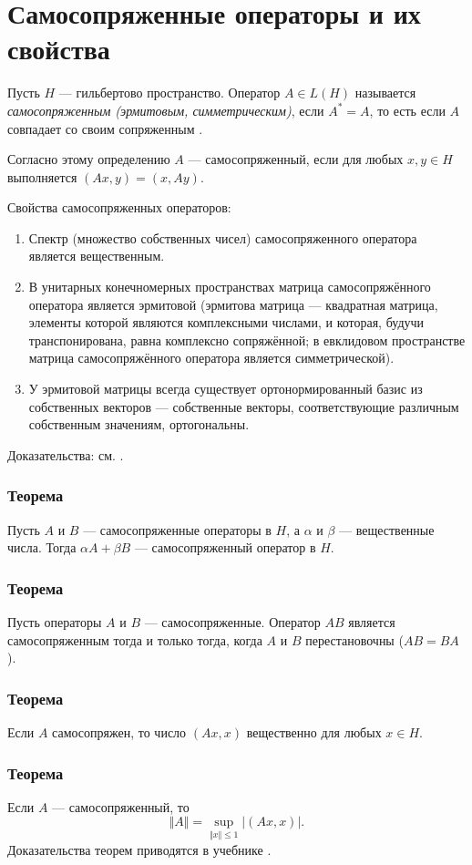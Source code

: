 \section{Самосопряженные операторы и их свойства}
\label{sec:q-29}
Пусть $H$ --- гильбертово пространство. Оператор $A \in L(H)$ называется \textit{самосопряженным (эрмитовым, симметрическим)}, если $A^* = A$, то есть если $A$ совпадает со своим сопряженным \cite[с.~181]{trenogin}.

Согласно этому определению $A$ --- самосопряженный, если для любых $x, y \in H$ выполняется $(Ax, y) = (x, Ay).$

Свойства самосопряженных операторов:
\begin{enumerate}
	\itemsep0pt
	\item Спектр (множество собственных чисел) самосопряженного оператора является вещественным.
	\item В унитарных конечномерных пространствах матрица самосопряжённого оператора является эрмитовой (эрмитова матрица --- квадратная матрица, элементы которой являются комплексными числами, и которая, будучи транспонирована, равна комплексно сопряжённой; в евклидовом пространстве матрица самосопряжённого оператора является симметрической).
	\item У эрмитовой матрицы всегда существует ортонормированный базис из собственных векторов — собственные векторы, соответствующие различным собственным значениям, ортогональны.
\end{enumerate}
Доказательства: см. \cite{hermit-operator}.

\subsubsection*{Теорема}
Пусть $A$ и $B$ --- самосопряженные операторы в $H$, а $\alpha$ и $\beta$ --- вещественные числа. Тогда $\alpha A + \beta B$ --- самосопряженный оператор в $H$.

\subsubsection*{Теорема}
Пусть операторы $A$ и $B$ --- самосопряженные. Оператор $AB$ является самосопряженным тогда и только тогда, когда $A$ и $B$ перестановочны ($AB = BA$).

\subsubsection*{Теорема}
Если $A$ самосопряжен, то число $(Ax, x)$ вещественно для любых $x \in H$.

\subsubsection*{Теорема}
Если $A$ --- самосопряженный, то
$$\Vert A \Vert = \sup_{\Vert x \Vert \leqslant 1} | (Ax, x)|.$$
Доказательства теорем приводятся в учебнике \cite[с.~181]{trenogin}.